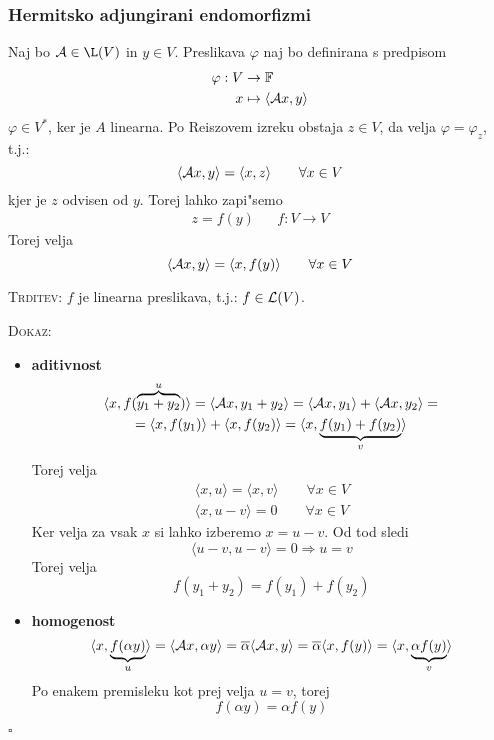 \subsubsection{Hermitsko adjungirani endomorfizmi}
Naj bo $\A \in \L(V)$ in $y \in V$. Preslikava $\varphi$ naj bo definirana s predpisom
\begin{align*}
\varphi: V &\to \operatorname{\mathbb{F}} \\
x &\mapsto \langle \mathcal{A} x, y \rangle
\end{align*}
$\varphi \in V^*$, ker je $A$ linearna. Po Reiszovem izreku obstaja $z \in V$, da velja $\varphi = \varphi_z$, t.j.:
\begin{equation*}
\langle \mathcal{A} x, y \rangle = \langle x, z \rangle \qquad \forall x \in V
\end{equation*}
kjer je $z$ odvisen od $y$. Torej lahko zapi"semo
\begin{align*}
z = f(y) && f: V \to V
\end{align*}
Torej velja
\begin{equation*}
\langle \mathcal{A} x, y \rangle = \langle x, f(y) \rangle \qquad \forall x \in V
\end{equation*}

\textsc{Trditev:} $f$ je linearna preslikava, t.j.: $f \in \mathcal{L}(V)$.

\textsc{Dokaz:}
\begin{itemize}
    \item \textbf{aditivnost}
    \begin{multline*}
    \langle x, f(\overbrace{y_1 + y_2}^u) \rangle = \langle \mathcal{A} x, y_1 + y_2 \rangle = \langle \mathcal{A} x, y_1 \rangle + \langle \mathcal{A} x, y_2 \rangle = \\
    = \langle x, f(y_1) \rangle + \langle x, f(y_2) \rangle = \langle x,\underbrace{ f(y_1) + f(y_2)}_v \rangle
    \end{multline*}
    Torej velja
    \begin{gather*}
    \langle x, u \rangle = \langle x, v \rangle \qquad \forall x \in V \\
    \langle x, u - v \rangle = 0 \qquad \forall x \in V
    \end{gather*}
    Ker velja za vsak $x$ si lahko izberemo $x = u - v$. Od tod sledi
    \begin{equation*}
    \langle u - v, u - v \rangle = 0 \Rightarrow u = v
    \end{equation*}
    Torej velja
    \begin{equation*}
    f(y_1 + y_2) = f(y_1) + f(y_2)
    \end{equation*}
    
    \item \textbf{homogenost}
    \begin{equation*}
    \langle x, \underbrace{f(\alpha y)}_u \rangle = \langle \mathcal{A} x, \alpha y \rangle = \overline{\alpha} \langle \mathcal{A} x, y \rangle = \overline{\alpha} \langle x, f(y) \rangle = \langle x,\underbrace{ \alpha f(y)}_v \rangle
    \end{equation*}
    Po enakem premisleku kot prej velja $u = v$, torej
    \begin{equation*}
    f(\alpha y) = \alpha f(y)
    \end{equation*}
\end{itemize}
\hfill $\square$


